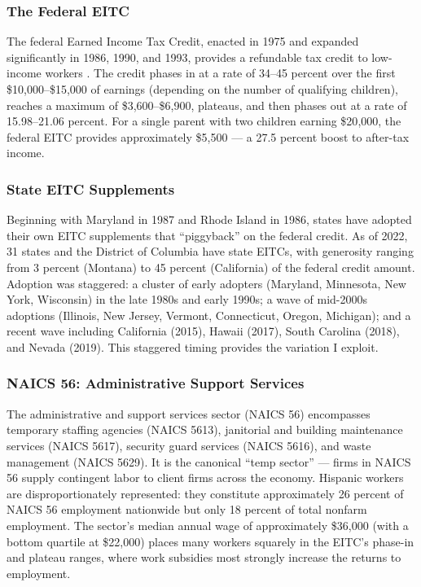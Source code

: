 \documentclass[12pt]{article}
\begin{document}
\subsubsection*{The Federal EITC} The federal Earned Income Tax Credit, enacted in 1975 and expanded significantly in 1986, 1990, and 1993, provides a refundable tax credit to low-income workers \citep{hotz2006earned}. The credit phases in at a rate of 34--45 percent over the first \$10{,}000--\$15{,}000 of earnings (depending on the number of qualifying children), reaches a maximum of \$3{,}600--\$6{,}900, plateaus, and then phases out at a rate of 15.98--21.06 percent. For a single parent with two children earning \$20{,}000, the federal EITC provides approximately \$5{,}500 --- a 27.5 percent boost to after-tax income.

\subsubsection*{State EITC Supplements} Beginning with Maryland in 1987 and Rhode Island in 1986, states have adopted their own EITC supplements that ``piggyback'' on the federal credit. As of 2022, 31 states and the District of Columbia have state EITCs, with generosity ranging from 3 percent (Montana) to 45 percent (California) of the federal credit amount. Adoption was staggered: a cluster of early adopters (Maryland, Minnesota, New York, Wisconsin) in the late 1980s and early 1990s; a wave of mid-2000s adoptions (Illinois, New Jersey, Vermont, Connecticut, Oregon, Michigan); and a recent wave including California (2015), Hawaii (2017), South Carolina (2018), and Nevada (2019). This staggered timing provides the variation I exploit.

\subsubsection*{NAICS 56: Administrative Support Services} The administrative and support services sector (NAICS 56) encompasses temporary staffing agencies (NAICS 5613), janitorial and building maintenance services (NAICS 5617), security guard services (NAICS 5616), and waste management (NAICS 5629). It is the canonical ``temp sector'' --- firms in NAICS 56 supply contingent labor to client firms across the economy. Hispanic workers are disproportionately represented: they constitute approximately 26 percent of NAICS 56 employment nationwide but only 18 percent of total nonfarm employment. The sector's median annual wage of approximately \$36{,}000 (with a bottom quartile at \$22{,}000) places many workers squarely in the EITC's phase-in and plateau ranges, where work subsidies most strongly increase the returns to employment.
\end{document}
